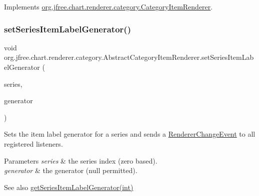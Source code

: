 Implements \mbox{\hyperlink{interfaceorg_1_1jfree_1_1chart_1_1renderer_1_1category_1_1_category_item_renderer_a21871e4d309e252c004b96b93914bbc2}{org.\+jfree.\+chart.\+renderer.\+category.\+Category\+Item\+Renderer}}.

\mbox{\label{classorg_1_1jfree_1_1chart_1_1renderer_1_1category_1_1_abstract_category_item_renderer_a68950a45e273433edc3343a958860bf6}} 
\subsubsection{\texorpdfstring{set\+Series\+Item\+Label\+Generator()}{setSeriesItemLabelGenerator()}}
{\footnotesize\ttfamily void org.\+jfree.\+chart.\+renderer.\+category.\+Abstract\+Category\+Item\+Renderer.\+set\+Series\+Item\+Label\+Generator (\begin{DoxyParamCaption}\item[{int}]{series,  }\item[{\mbox{\hyperlink{interfaceorg_1_1jfree_1_1chart_1_1labels_1_1_category_item_label_generator}{Category\+Item\+Label\+Generator}}}]{generator }\end{DoxyParamCaption})}

Sets the item label generator for a series and sends a \mbox{\hyperlink{}{Renderer\+Change\+Event}} to all registered listeners.


\begin{DoxyParams}{Parameters}
{\em series} & the series index (zero based). \\
\hline
{\em generator} & the generator ({\ttfamily null} permitted).\\
\hline
\end{DoxyParams}
\begin{DoxySeeAlso}{See also}
\mbox{\hyperlink{classorg_1_1jfree_1_1chart_1_1renderer_1_1category_1_1_abstract_category_item_renderer_a2ec1e67d9952e7d8d39ba4a9f59184f7}{get\+Series\+Item\+Label\+Generator(int)}} 
\end{DoxySeeAlso}


